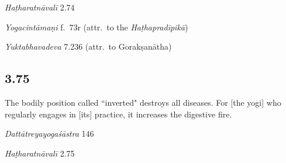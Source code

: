 \begin{ekdosis}
\begin{testimonia}[hp03_074]
\emph{Haṭharatnāvalī} 2.74
\begin{versinnote}
\end{versinnote}

\emph{Yogacintāmaṇi} f.~73r (attr.~to the \emph{Haṭhapradīpikā})
\begin{versinnote}
\end{versinnote}

\emph{Yuktabhavadeva} 7.236 (attr.~to Gorakṣanātha)
\begin{versinnote}
\end{versinnote}
\end{testimonia}



\subsection*{3.75}
\begin{translation}[hp03_075]
The bodily position called “inverted" destroys all diseases. For [the yogi] who regularly engages in [its] practice, it increases the digestive fire.
\end{translation}

\begin{sources}[hp03_075]
\emph{Dattātreyayogaśāstra} 146
\begin{versinnote}
\end{versinnote}
\end{sources}

\begin{testimonia}[hp03_075]
\emph{Haṭharatnāvalī} 2.75
\begin{versinnote}
\end{versinnote}


\end{testimonia}
\end{ekdosis}

